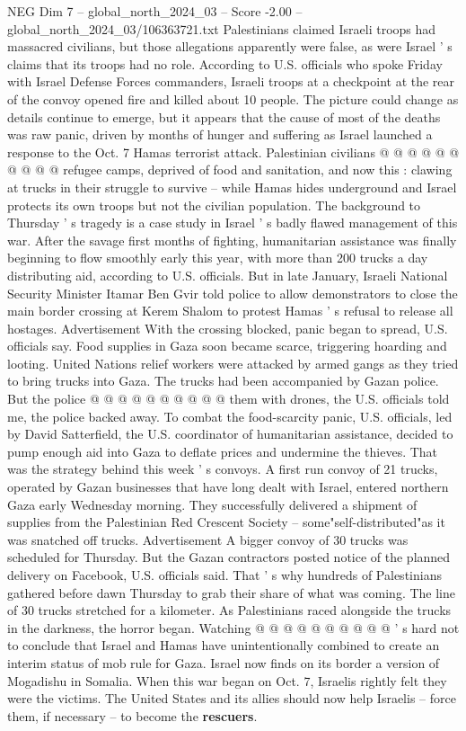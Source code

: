 \begin{textsample}{NEG Dim 7 – global\_north\_2024\_03 – Score -2.00 – global\_north\_2024\_03/106363721.txt}
Palestinians claimed Israeli troops had massacred civilians, but those allegations apparently were false, as were Israel ' s claims that its troops had no role.
According to U.S. officials who spoke Friday with Israel Defense Forces commanders, Israeli troops at a checkpoint at the rear of the convoy opened fire and killed about 10 people.
The picture could change as details continue to emerge, but it appears that the cause of most of the deaths was raw panic, driven by months of hunger and suffering as Israel launched a response to the Oct. 7 Hamas terrorist attack.
Palestinian civilians @ @ @ @ @ @ @ @ @ @ refugee camps, deprived of food and sanitation, and now this : clawing at trucks in their struggle to survive -- while Hamas hides underground and Israel protects its own troops but not the civilian population.
The background to Thursday ' s tragedy is a case study in Israel ' s badly flawed management of this war.
After the savage first months of fighting, humanitarian assistance was finally beginning to flow smoothly early this year, with more than 200 trucks a day distributing aid, according to U.S. officials.
But in late January, Israeli National Security Minister Itamar Ben Gvir told police to allow demonstrators to close the main border crossing at Kerem Shalom to protest Hamas ' s refusal to release all hostages.
Advertisement With the crossing blocked, panic began to spread, U.S. officials say.
Food supplies in Gaza soon became scarce, triggering hoarding and looting.
United Nations relief workers were attacked by armed gangs as they tried to bring trucks into Gaza.
The trucks had been accompanied by Gazan police.
But the police @ @ @ @ @ @ @ @ @ @ them with drones, the U.S. officials told me, the police backed away.
To combat the food-scarcity panic, U.S. officials, led by David Satterfield, the U.S. coordinator of humanitarian assistance, decided to pump enough aid into Gaza to deflate prices and undermine the thieves.
That was the strategy behind this week ' s convoys.
A first run convoy of 21 trucks, operated by Gazan businesses that have long dealt with Israel, entered northern Gaza early Wednesday morning.
They successfully delivered a shipment of supplies from the Palestinian Red Crescent Society -- some"self-distributed"as it was snatched off trucks.
Advertisement A bigger convoy of 30 trucks was scheduled for Thursday.
But the Gazan contractors posted notice of the planned delivery on Facebook, U.S. officials said.
That ' s why hundreds of Palestinians gathered before dawn Thursday to grab their share of what was coming.
The line of 30 trucks stretched for a kilometer.
As Palestinians raced alongside the trucks in the darkness, the horror began.
Watching @ @ @ @ @ @ @ @ @ @ ' s hard not to conclude that Israel and Hamas have unintentionally combined to create an interim status of mob rule for Gaza.
Israel now finds on its border a version of Mogadishu in Somalia.
When this war began on Oct. 7, Israelis rightly felt they were the victims.
The United States and its allies should now help Israelis -- force them, if necessary -- to become the \textbf{rescuers}.

\end{textsample}
